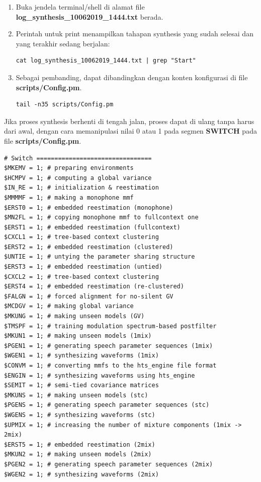 \documentclass[12pt,]{article}
\begin{document}
	\begin{enumerate}
		\item Buka jendela terminal/shell di alamat file \textbf{log\_synthesis\_10062019\_1444.txt} berada.

		\item Perintah untuk print menampilkan tahapan synthesis yang sudah selesai dan yang terakhir sedang berjalan:
		\begin{verbatim}
cat log_synthesis_10062019_1444.txt | grep "Start"
		\end{verbatim}

		\item Sebagai pembanding, dapat dibandingkan dengan konten konfigurasi di file \textbf{scripts/Config.pm}.
		\begin{verbatim}
tail -n35 scripts/Config.pm
		\end{verbatim}

	\end{enumerate}

	Jika proses synthesis berhenti di tengah jalan, proses dapat di ulang tanpa harus dari awal,
	dengan cara memanipulasi nilai 0 atau 1 pada segmen \textbf{SWITCH} pada file \textbf{scripts/Config.pm}.

	\begin{verbatim}
# Switch ================================
$MKEMV = 1; # preparing environments
$HCMPV = 1; # computing a global variance
$IN_RE = 1; # initialization & reestimation
$MMMMF = 1; # making a monophone mmf
$ERST0 = 1; # embedded reestimation (monophone)
$MN2FL = 1; # copying monophone mmf to fullcontext one
$ERST1 = 1; # embedded reestimation (fullcontext)
$CXCL1 = 1; # tree-based context clustering
$ERST2 = 1; # embedded reestimation (clustered)
$UNTIE = 1; # untying the parameter sharing structure
$ERST3 = 1; # embedded reestimation (untied)
$CXCL2 = 1; # tree-based context clustering
$ERST4 = 1; # embedded reestimation (re-clustered)
$FALGN = 1; # forced alignment for no-silent GV
$MCDGV = 1; # making global variance
$MKUNG = 1; # making unseen models (GV)
$TMSPF = 1; # training modulation spectrum-based postfilter
$MKUN1 = 1; # making unseen models (1mix)
$PGEN1 = 1; # generating speech parameter sequences (1mix)
$WGEN1 = 1; # synthesizing waveforms (1mix)
$CONVM = 1; # converting mmfs to the hts_engine file format
$ENGIN = 1; # synthesizing waveforms using hts_engine
$SEMIT = 1; # semi-tied covariance matrices
$MKUNS = 1; # making unseen models (stc)
$PGENS = 1; # generating speech parameter sequences (stc)
$WGENS = 1; # synthesizing waveforms (stc)
$UPMIX = 1; # increasing the number of mixture components (1mix -> 2mix)
$ERST5 = 1; # embedded reestimation (2mix)
$MKUN2 = 1; # making unseen models (2mix)
$PGEN2 = 1; # generating speech parameter sequences (2mix)
$WGEN2 = 1; # synthesizing waveforms (2mix)
	\end{verbatim}
\end{document}
